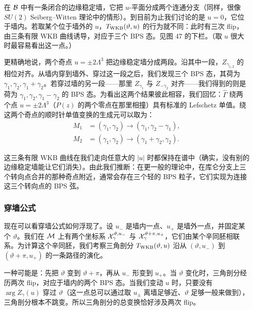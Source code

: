 在 $\mathcal{B}$ 中有一条闭合的边缘稳定墙，它把 $u$-平面分成两个连通分支（同样，很像 $SU(2)$ Seiberg–Witten 理论中的情形）。到目前为止我们讨论的是 $u=0$，它位于墙内。若取某个位于墙外的 $u$，$T_{\rm WKB}(\vartheta, u)$ 的行为就不同：此时有三次 flip，由三条有限 WKB 曲线诱导，对应于三个 BPS 态。见图 47 的下栏。（取 $u$ 很大时最容易看出这一点。）

更精确地说，两个奇点 $u = \pm 2 \Lambda^3$ 把边缘稳定墙分成两段。沿其中一段，$Z_{\gamma_{1,2}}$ 的相位对齐。从墙内穿到墙外、穿过这一段之后，我们发现三个 BPS 态，其荷为 $\gamma_1, \gamma_2, \gamma_1 + \gamma_2$。若穿过墙的另一段——那里 $Z_{\gamma_1}$ 与 $Z_{-\gamma_2}$ 对齐——我们得到的则是荷为 $\gamma_1, \gamma_2, \gamma_1-\gamma_2$ 的 BPS 态。为看出这两个结果彼此相容，我们回忆：$\hat\Gamma$ 绕两个点 $u = \pm 2 \Lambda^3$（$P(z)$ 的两个零点在那里相撞）具有标准的 Lefschetz 单值。绕这两个奇点的顺时针单值变换的生成元可以取为：
\begin{equation}\label{eq:LocalSys-1}
\begin{aligned}
M_1 &= (\gamma_1, \gamma_2) \to (\gamma_1, \gamma_2-\gamma_1), \\
M_2 &= (\gamma_1, \gamma_2) \to (\gamma_1+\gamma_2, \gamma_2).
\end{aligned}
\end{equation}

这三条有限 WKB 曲线在我们走向任意大的 $|u|$ 时都保持在谱中（确实，没有别的边缘稳定墙能让它们消失）。由此我们推断：在更一般的理论中，在库仑分支上三个转向点合并的那种奇点附近，通常会存在三个轻的 BPS 粒子，它们实现为连接这三个转向点的 BPS 弦。


\subsubsection*{穿墙公式}

现在可以看穿墙公式如何浮现了。设 $u_-$ 是墙内一点、$u_+$ 是墙外一点，并固定某个 $\vartheta$。我们在 $\mathcal{M}$ 上有两个坐标系 $\mathcal{X}^{\vartheta, u_-}_\gamma$ 与 $\mathcal{X}^{\vartheta+\pi, u_+}_\gamma$，它们由某个辛同胚相联系。为计算这个辛同胚，我们考察三角剖分 $T_{\rm WKB}(\vartheta, u)$ 沿从 $(\vartheta, u_-)$ 到 $(\vartheta+\pi, u_+)$ 的一条路径的演化。

一种可能是：先把 $\vartheta$ 变到 $\vartheta+\pi$，再从 $u_-$ 形变到 $u_+$。当 $\vartheta$ 变化时，三角剖分经历两次 flip，对应于墙内的两个 BPS 态。当我们变动 $u$ 时，只要没有 $\arg Z_{\gamma}(u)$ 穿过 $\vartheta$（这一点总可以通过取 $u_\pm$ 离墙足够近、$\vartheta$ 足够一般来做到），三角剖分根本不跳变。所以三角剖分的总变换恰好涉及两次 flip。

